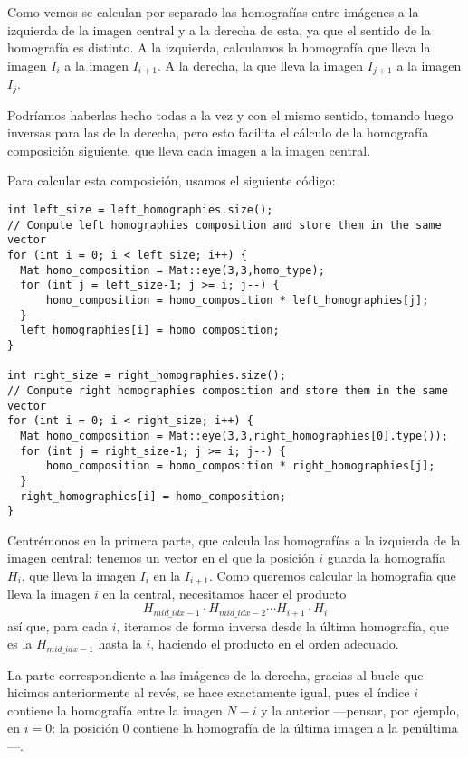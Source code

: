 \documentclass[a4paper, 11pt]{article}
\theoremstyle{definition}
\theoremstyle{theorem}
\begin{document}
   Como vemos se calculan por separado las homografías entre imágenes a la izquierda de la imagen central y a la derecha de esta, ya que el sentido de la homografía es distinto. A la izquierda, calculamos la homografía que lleva la imagen $I_i$ a la imagen $I_{i+1}$. A la derecha, la que lleva la imagen $I_{j+1}$ a la imagen $I_j$.

   Podríamos haberlas hecho todas a la vez y con el mismo sentido, tomando luego inversas para las de la derecha, pero esto facilita el cálculo de la homografía composición siguiente, que lleva cada imagen a la imagen central.

   Para calcular esta composición, usamos el siguiente código:
   \begin{lstlisting}
int left_size = left_homographies.size();
// Compute left homographies composition and store them in the same vector
for (int i = 0; i < left_size; i++) {
  Mat homo_composition = Mat::eye(3,3,homo_type);
  for (int j = left_size-1; j >= i; j--) {
      homo_composition = homo_composition * left_homographies[j];
  }
  left_homographies[i] = homo_composition;
}

int right_size = right_homographies.size();
// Compute right homographies composition and store them in the same vector
for (int i = 0; i < right_size; i++) {
  Mat homo_composition = Mat::eye(3,3,right_homographies[0].type());
  for (int j = right_size-1; j >= i; j--) {
      homo_composition = homo_composition * right_homographies[j];
  }
  right_homographies[i] = homo_composition;
}
    \end{lstlisting}

    Centrémonos en la primera parte, que calcula las homografías a la izquierda de la imagen central: tenemos un vector en el que la posición $i$ guarda la homografía $H_i$, que lleva la imagen $I_i$ en la $I_{i+1}$. Como queremos calcular la homografía que lleva la imagen $i$ en la central, necesitamos hacer el producto
    \[
    H_{mid\_idx-1} \cdot H_{mid\_idx-2} \cdots H_{i+1} \cdot H_i
    \]
    así que, para cada $i$, iteramos de forma inversa desde la última homografía, que es la $H_{mid\_idx-1}$ hasta la $i$, haciendo el producto en el orden adecuado.

    La parte correspondiente a las imágenes de la derecha, gracias al bucle que hicimos anteriormente al revés, se hace exactamente igual, pues el índice $i$ contiene la homografía entre la imagen $N-i$ y la anterior ---pensar, por ejemplo, en $i=0$: la posición $0$ contiene la homografía de la última imagen a la penúltima---.
\end{document}
